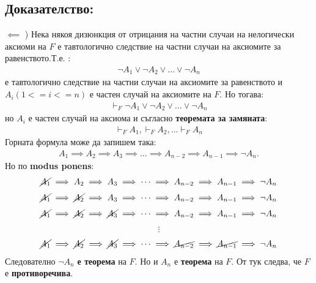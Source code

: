 \documentclass[french]{article}
\begin{document}
\subsection*{Доказателство:}
$\impliedby$ ) Нека някоя дизюнкция от отрицания на частни случаи на нелогически аксиоми на $F$ е тавтологично следствие на частни случаи на аксиомите за равенството.Т.е. : 
\begin{align*}
\neg A_1 \lor \neg A_2 \lor \dots \lor \neg A_n
\end{align*}
е тавтологично следствие на частни случаи на аксиомите за равенството и $A_i (1 <= i <= n)$ е частен случай на аксиомите на $F$.
Но тогава:
\begin{align*}
 \vdash_F \neg A_1 \lor \neg A_2 \lor \dots \lor \neg A_n
\end{align*}
но $A_i$ е частен случай на аксиома и съгласно \textbf{теоремата за замяната}: 
\begin{align*}
\vdash_F  A_1, \vdash_F A_2,  \dots \vdash_F  A_n
\end{align*}
Горната формула може да запишем така:
\begin{align*}
 A_1 \implies A_2 \implies A_3 \implies \dots \implies A_{n-2} \implies A_{n-1} \implies \neg A_n.
\end{align*}
Но по \textbf{modus ponens}:  
\begin{align*}
 \cancel{A_1} \implies A_2 \implies A_3 \implies \dots \implies A_{n-2} \implies A_{n-1} \implies \neg A_n 
\end{align*} 
\begin{align*}
  \cancel{A_1} \implies \cancel{A_2} \implies A_3 \implies \dots \implies A_{n-2} \implies A_{n-1} \implies \neg A_n 
\end{align*}
\begin{align*}
\cancel{A_1} \implies \cancel{A_2} \implies \cancel{A_3} \implies \dots \implies A_{n-2} \implies A_{n-1} \implies \neg A_n 
\end{align*}
\begin{align*}
\vdots
\end{align*}
\begin{align*}
\cancel{A_1} \implies \cancel{A_2} \implies \cancel{A_3} \implies \dots \implies \cancel{A_{n-2}} \implies \cancel{A_{n-1}} \implies \neg A_n 
\end{align*}
Следователно $\neg A_n$ \textbf{е теорема} на $F$. Но и $A_n$ е \textbf{теорема} на $F$. \newline От тук следва, че $F$ е \textbf{противоречива}. \newline \newline
\end{document}

